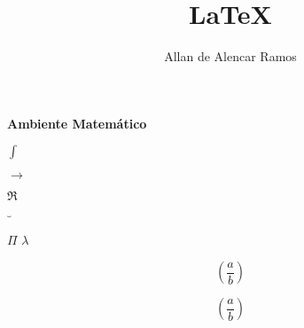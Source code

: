 \documentclass[12pt, a4paper]{article}
\begin{document}
\title{LaTeX}
\author{Allan de Alencar Ramos}
\maketitle

\begin{center}
\large\textbf{Ambiente Matemático}
\end{center}
\vspace{0.5cm}

$ \int $

$ \longrightarrow $

$ \Re $

$ \underbrace{} $

$ \Pi $
$ \lambda $

\begin{equation}
( \frac{a}{b} )
\end{equation}

\begin{equation}
\left( \frac{a}{b} \right)
\end{equation}
\end{document}
